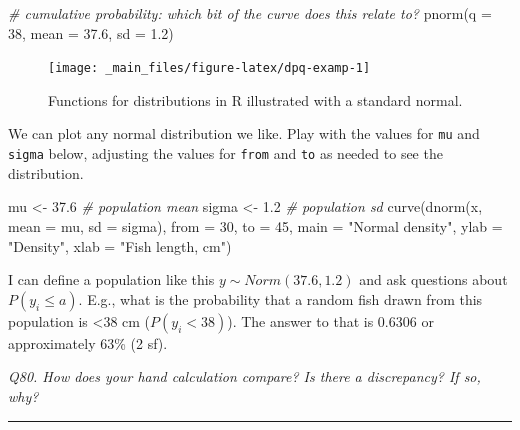 \documentclass[
  11pt,
  a4paper,
]{book}
\newenvironment{Shaded}{\begin{snugshade}}{\end{snugshade}}
\newcommand{\AttributeTok}[1]{\textcolor[rgb]{0.77,0.63,0.00}{#1}}
\newcommand{\CommentTok}[1]{\textcolor[rgb]{0.56,0.35,0.01}{\textit{#1}}}
\newcommand{\DecValTok}[1]{\textcolor[rgb]{0.00,0.00,0.81}{#1}}
\newcommand{\FloatTok}[1]{\textcolor[rgb]{0.00,0.00,0.81}{#1}}
\newcommand{\FunctionTok}[1]{\textcolor[rgb]{0.00,0.00,0.00}{#1}}
\newcommand{\NormalTok}[1]{#1}
\newcommand{\OtherTok}[1]{\textcolor[rgb]{0.56,0.35,0.01}{#1}}
\newcommand{\StringTok}[1]{\textcolor[rgb]{0.31,0.60,0.02}{#1}}
\begin{document}
\begin{Shaded}
\begin{Highlighting}[]
\CommentTok{\# cumulative probability: which bit of the curve does this relate to?}
\FunctionTok{pnorm}\NormalTok{(}\AttributeTok{q =} \DecValTok{38}\NormalTok{, }\AttributeTok{mean =} \FloatTok{37.6}\NormalTok{, }\AttributeTok{sd =} \FloatTok{1.2}\NormalTok{) }
\end{Highlighting}
\end{Shaded}

\begin{figure}

{\centering \texttt{[image: \_main\_files/figure-latex/dpq-examp-1]} 

}

\caption{Functions for distributions in R illustrated with a standard normal.}\label{fig:dpq-examp}
\end{figure}

We can plot any normal distribution we like. Play with the values for \texttt{mu} and \texttt{sigma} below, adjusting the values for \texttt{from} and \texttt{to} as needed to see the distribution.

\begin{Shaded}
\begin{Highlighting}[]
\NormalTok{mu }\OtherTok{\textless{}{-}} \FloatTok{37.6}  \CommentTok{\# population mean}
\NormalTok{sigma }\OtherTok{\textless{}{-}} \FloatTok{1.2}  \CommentTok{\# population sd}
\FunctionTok{curve}\NormalTok{(}\FunctionTok{dnorm}\NormalTok{(x, }\AttributeTok{mean =}\NormalTok{ mu, }\AttributeTok{sd =}\NormalTok{ sigma), }\AttributeTok{from =} \DecValTok{30}\NormalTok{, }\AttributeTok{to =} \DecValTok{45}\NormalTok{,}
      \AttributeTok{main =} \StringTok{"Normal density"}\NormalTok{, }\AttributeTok{ylab =} \StringTok{"Density"}\NormalTok{, }\AttributeTok{xlab =} \StringTok{"Fish length, cm"}\NormalTok{)}
\end{Highlighting}
\end{Shaded}

I can define a population like this \(y \sim Norm(37.6, 1.2)\) and ask questions about \(P(y_i \leq a)\). E.g., what is the probability that a random fish drawn from this population is \textless38 cm (\(P(y_i < 38)\)). The answer to that is 0.6306 or approximately 63\% (2 sf).

\emph{Q80. How does your hand calculation compare? Is there a discrepancy? If so, why?}

\begin{center}\rule{0.5\linewidth}{0.5pt}\end{center}
\end{document}
